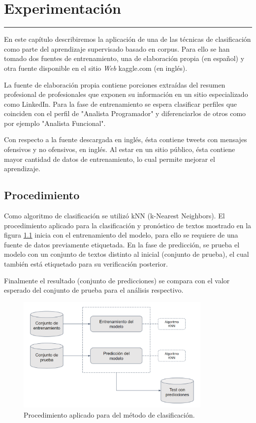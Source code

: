 \chapter{Experimentación}
\hrule \bigskip \vspace*{1cm}

En este capítulo describiremos la aplicación de una de las técnicas de clasificación como parte del aprendizaje supervisado basado en corpus. Para ello se han tomado dos fuentes de entrenamiento, una de elaboración propia (en español) y otra fuente disponible en el sitio \emph{Web} kaggle.com (en inglés).

La fuente de elaboración propia contiene porciones extraídas del resumen profesional de profesionales que exponen su información en un sitio especializado como LinkedIn. Para la fase de entrenamiento se espera clasificar perfiles que coinciden con el perfil de "Analista Programador" y diferenciarlos de otros como por ejemplo "Analista Funcional".

Con respecto a la fuente descargada en inglés, ésta contiene tweets con mensajes ofensivos y no ofensivos, en inglés. Al estar en un sitio público, ésta contiene mayor cantidad de datos de entrenamiento, lo cual permite mejorar el aprendizaje.

\section{Procedimiento}

Como algoritmo de clasificación se utilizó kNN (k-Nearest Neighbors). El procedimiento aplicado para la clasificación y pronóstico de textos mostrado en la figura \ref{fig:experimentacion} inicia con el entrenamiento del modelo, para ello se requiere de una fuente de datos previamente etiquetada. En la fase de predicción, se prueba el modelo con un conjunto de textos distinto al inicial (conjunto de prueba), el cual también está etiquetado para su verificación posterior.

Finalmente el resultado (conjunto de predicciones) se compara con el valor esperado del conjunto de prueba para el análisis respectivo.


\begin{figure}[h!]
	\begin{center}
	\includegraphics[angle=0,width=9.5cm]{Graficos/experimentacion1}
	\caption{Procedimiento aplicado para del método de clasificación.}
	\label{fig:experimentacion}
  \end{center}
\end{figure}

